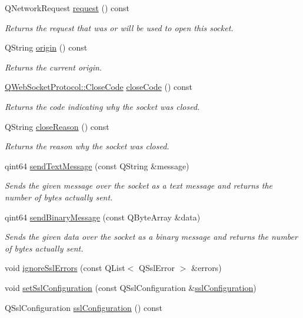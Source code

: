 \begin{DoxyCompactItemize}
Q\+Network\+Request \mbox{\hyperlink{class_q_web_socket_a17b0d131ad2e4a0140f5faf23d30335c}{request}} () const
\begin{DoxyCompactList}\small\item\em Returns the request that was or will be used to open this socket. \end{DoxyCompactList}\item 
\mbox{\label{class_q_web_socket_af03bb3ce5ec1bcab0882e29fd3e62961}} 
Q\+String \mbox{\hyperlink{class_q_web_socket_af03bb3ce5ec1bcab0882e29fd3e62961}{origin}} () const
\begin{DoxyCompactList}\small\item\em Returns the current origin. \end{DoxyCompactList}\item 
\mbox{\hyperlink{namespace_q_web_socket_protocol_a9f236676f594451d8d723f260b71028c}{Q\+Web\+Socket\+Protocol\+::\+Close\+Code}} \mbox{\hyperlink{class_q_web_socket_ac0392e28fa81d5452868813d5e907d71}{close\+Code}} () const
\begin{DoxyCompactList}\small\item\em Returns the code indicating why the socket was closed. \end{DoxyCompactList}\item 
Q\+String \mbox{\hyperlink{class_q_web_socket_a64964f85bc0736ee350975ca6e47c3fe}{close\+Reason}} () const
\begin{DoxyCompactList}\small\item\em Returns the reason why the socket was closed. \end{DoxyCompactList}\item 
qint64 \mbox{\hyperlink{class_q_web_socket_aa3bdc1e29c50c1e0d88c0977eb298a17}{send\+Text\+Message}} (const Q\+String \&message)
\begin{DoxyCompactList}\small\item\em Sends the given {\itshape message} over the socket as a text message and returns the number of bytes actually sent. \end{DoxyCompactList}\item 
qint64 \mbox{\hyperlink{class_q_web_socket_aa56992d89ffba061ec6dc7c3e4a010f6}{send\+Binary\+Message}} (const Q\+Byte\+Array \&data)
\begin{DoxyCompactList}\small\item\em Sends the given {\itshape data} over the socket as a binary message and returns the number of bytes actually sent. \end{DoxyCompactList}\item 
void \mbox{\hyperlink{class_q_web_socket_ae3c765afbdc0e0afad03b8ad8c958fab}{ignore\+Ssl\+Errors}} (const Q\+List$<$ Q\+Ssl\+Error $>$ \&errors)
\item 
void \mbox{\hyperlink{class_q_web_socket_a2b47402d89258caa95e46452b698cc3a}{set\+Ssl\+Configuration}} (const Q\+Ssl\+Configuration \&\mbox{\hyperlink{class_q_web_socket_a002b89e651c50e9b73ec23d07f4f7eba}{ssl\+Configuration}})
\item 
Q\+Ssl\+Configuration \mbox{\hyperlink{class_q_web_socket_a002b89e651c50e9b73ec23d07f4f7eba}{ssl\+Configuration}} () const
\end{DoxyCompactItemize}
